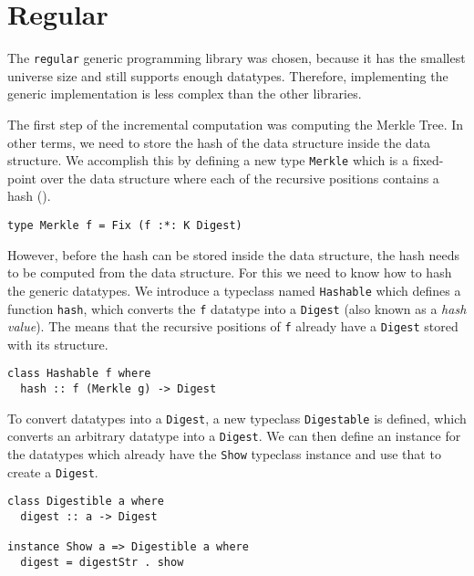 \section{Regular}

The \texttt{regular} generic programming library was chosen, because it has the smallest universe size and still supports enough datatypes. Therefore, implementing the generic implementation is less complex than the other libraries.


The first step of the incremental computation was computing the Merkle Tree. In other terms, we need to store the hash of the data structure inside the data structure. We accomplish this by defining a new type \texttt{Merkle} which is a fixed-point over the data structure where each of the recursive positions contains a hash ().

\begin{verbatim}
type Merkle f = Fix (f :*: K Digest)
\end{verbatim}

However, before the hash can be stored inside the data structure, the hash needs to be computed from the data structure. For this we need to know how to hash the generic datatypes. We introduce a typeclass named \texttt{Hashable} which defines a function \texttt{hash}, which converts the \texttt{f} datatype into a \texttt{Digest} (also known as a \textit{hash value}). The  means that the recursive positions of \texttt{f} already have a \texttt{Digest} stored with its structure. 

\begin{verbatim}
class Hashable f where
  hash :: f (Merkle g) -> Digest
\end{verbatim}

To convert datatypes into a \texttt{Digest}, a new typeclass \texttt{Digestable} is defined, which converts an arbitrary datatype into a \texttt{Digest}. We can then define an instance for the datatypes which already have the \texttt{Show} typeclass instance and use that to create a \texttt{Digest}.


\begin{verbatim}
class Digestible a where
  digest :: a -> Digest

instance Show a => Digestible a where
  digest = digestStr . show
\end{verbatim}

